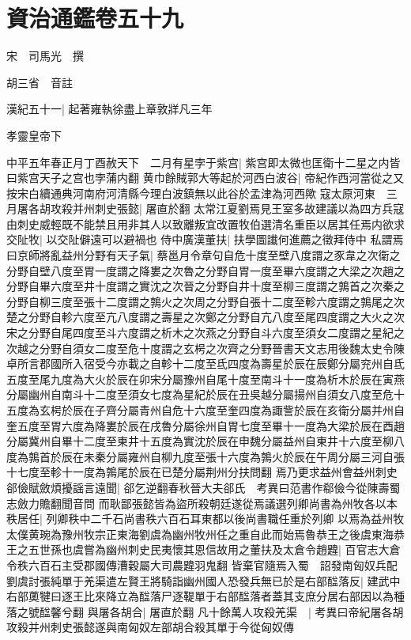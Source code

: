 \chapter{資治通鑑卷五十九}
宋　司馬光　撰

胡三省　音註

漢紀五十一|{
	起著雍執徐盡上章敦牂凡三年}


孝靈皇帝下

中平五年春正月丁酉赦天下　二月有星孛于紫宫|{
	紫宫即太微也匡衛十二星之内皆曰紫宫天子之宫也孛蒲内翻}
黄巾餘賊郭大等起於河西白波谷|{
	帝紀作西河當從之又按宋白續通典河南府河清縣今理白波鎮無以此谷於孟津為河西歟}
寇太原河東　三月屠各胡攻殺并州刺史張懿|{
	屠直於翻}
太常江夏劉焉見王室多故建議以為四方兵寇由刺史威輕既不能禁且用非其人以致離叛宜改置牧伯選清名重臣以居其任焉内欲求交阯牧|{
	以交阯僻遠可以避禍也}
侍中廣漢董扶|{
	扶學圖䜟何進薦之徵拜侍中}
私謂焉曰京師將亂益州分野有天子氣|{
	蔡邕月令章句自危十度至壁八度謂之豕韋之次衛之分野自壁八度至胃一度謂之降婁之次魯之分野自胃一度至畢六度謂之大梁之次趙之分野自畢六度至井十度謂之實沈之次晉之分野自井十度至柳三度謂之鶉首之次秦之分野自柳三度至張十二度謂之鶉火之次周之分野自張十二度至軫六度謂之鶉尾之次楚之分野自軫六度至亢八度謂之壽星之次鄭之分野自亢八度至尾四度謂之大火之次宋之分野自尾四度至斗六度謂之析木之次燕之分野自斗六度至須女二度謂之星紀之次越之分野自須女二度至危十度謂之玄枵之次齊之分野晉書天文志用後魏太史令陳卓所言郡國所入宿受今亦載之自軫十二度至氐四度為壽星於辰在辰鄭分屬兖州自氐五度至尾九度為大火於辰在卯宋分屬豫州自尾十度至南斗十一度為析木於辰在寅燕分屬幽州自南斗十二度至須女七度為星紀於辰在丑吳越分屬揚州自須女八度至危十五度為玄枵於辰在子齊分屬青州自危十六度至奎四度為諏訾於辰在亥衛分屬并州自奎五度至胃六度為降婁於辰在戌魯分屬徐州自胃七度至畢十一度為大梁於辰在酉趙分屬冀州自畢十二度至東井十五度為實沈於辰在申魏分屬益州自東井十六度至柳八度為鶉首於辰在未秦分屬雍州自柳九度至張十六度為鶉火於辰在午周分屬三河自張十七度至軫十一度為鶉尾於辰在已楚分屬荆州分扶問翻}
焉乃更求益州會益州刺史郤儉賦斂煩擾謡言遠聞|{
	郤乞逆翻春秋晉大夫郤氏　考異曰范書作郗儉今從陳壽蜀志斂力贍翻聞音問}
而耿鄙張懿皆為盜所殺朝廷遂從焉議選列卿尚書為州牧各以本秩居任|{
	列卿秩中二千石尚書秩六百石耳東都以後尚書職任重於列卿}
以焉為益州牧太僕黄琬為豫州牧宗正東海劉虞為幽州牧州任之重自此而始焉魯恭王之後虞東海恭王之五世孫也虞嘗為幽州刺史民夷懷其恩信故用之董扶及太倉令趙韙|{
	百官志大倉令秩六百石主受郡國傳漕穀屬大司農韙羽鬼翻}
皆棄官隨焉入蜀　詔發南匈奴兵配劉虞討張純單于羌渠遣左賢王將騎詣幽州國人恐發兵無已於是右部䤈落反|{
	建武中右部薁犍曰逐王比來降立為䤈落尸逐鞮單于右部䤈落者蓋其支庶分居右部因以為種落之號䤈馨兮翻}
與屠各胡合|{
	屠直於翻}
凡十餘萬人攻殺羌渠　|{
	考異曰帝紀屠各胡攻殺并州刺史張懿遂與南匈奴左部胡合殺其單于今從匈奴傳}
